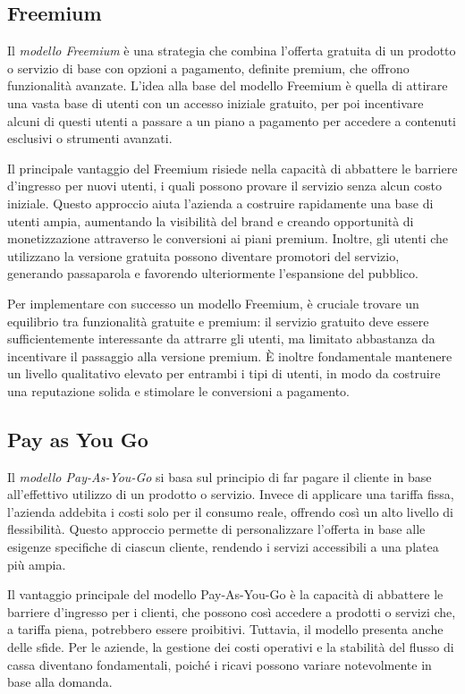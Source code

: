 \subsection*{Freemium}
Il \textit{modello Freemium} è una strategia che combina l’offerta gratuita di un prodotto o servizio di base con opzioni a pagamento, definite premium, che offrono funzionalità avanzate. L’idea alla base del modello Freemium è quella di attirare una vasta base di utenti con un accesso iniziale gratuito, per poi incentivare alcuni di questi utenti a passare a un piano a pagamento per accedere a contenuti esclusivi o strumenti avanzati.

Il principale vantaggio del Freemium risiede nella capacità di abbattere le barriere d’ingresso per nuovi utenti, i quali possono provare il servizio senza alcun costo iniziale. Questo approccio aiuta l’azienda a costruire rapidamente una base di utenti ampia, aumentando la visibilità del brand e creando opportunità di monetizzazione attraverso le conversioni ai piani premium. Inoltre, gli utenti che utilizzano la versione gratuita possono diventare promotori del servizio, generando passaparola e favorendo ulteriormente l’espansione del pubblico.

Per implementare con successo un modello Freemium, è cruciale trovare un equilibrio tra funzionalità gratuite e premium: il servizio gratuito deve essere sufficientemente interessante da attrarre gli utenti, ma limitato abbastanza da incentivare il passaggio alla versione premium. È inoltre fondamentale mantenere un livello qualitativo elevato per entrambi i tipi di utenti, in modo da costruire una reputazione solida e stimolare le conversioni a pagamento.

\subsection*{Pay as You Go}
Il \textit{modello Pay-As-You-Go} si basa sul principio di far pagare il cliente in base all’effettivo utilizzo di un prodotto o servizio. Invece di applicare una tariffa fissa, l’azienda addebita i costi solo per il consumo reale, offrendo così un alto livello di flessibilità. Questo approccio permette di personalizzare l’offerta in base alle esigenze specifiche di ciascun cliente, rendendo i servizi accessibili a una platea più ampia.

Il vantaggio principale del modello Pay-As-You-Go è la capacità di abbattere le barriere d’ingresso per i clienti, che possono così accedere a prodotti o servizi che, a tariffa piena, potrebbero essere proibitivi. Tuttavia, il modello presenta anche delle sfide. Per le aziende, la gestione dei costi operativi e la stabilità del flusso di cassa diventano fondamentali, poiché i ricavi possono variare notevolmente in base alla domanda.

